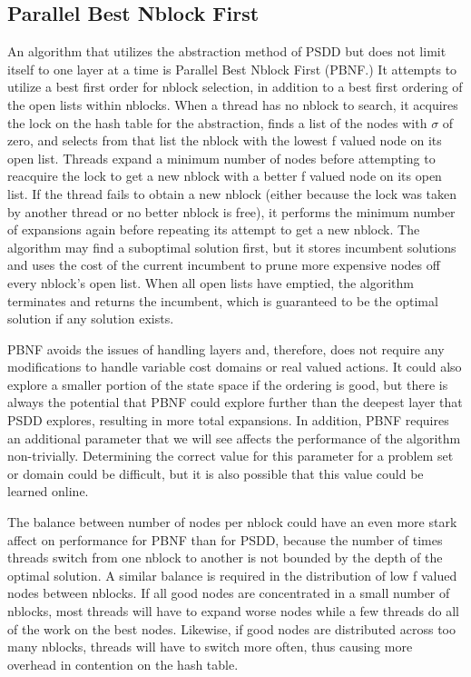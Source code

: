 \documentclass{article}
\begin{document}
\subsection{Parallel Best Nblock First}
An algorithm that utilizes the abstraction method of PSDD but does not limit itself to one layer at a time is Parallel Best Nblock First (PBNF.) It attempts to utilize a best first order for nblock selection, in addition to a best first ordering of the open lists within nblocks. When a thread has no nblock to search, it acquires the lock on the hash table for the abstraction, finds a list of the nodes with $\sigma$ of zero, and selects from that list the nblock with the lowest f valued node on its open list. Threads expand a minimum number of nodes before attempting to reacquire the lock to get a new nblock with a better f valued node on its open list. If the thread fails to obtain a new nblock (either because the lock was taken by another thread or no better nblock is free), it performs the minimum number of expansions again before repeating its attempt to get a new nblock. The algorithm may find a suboptimal solution first, but it stores incumbent solutions and uses the cost of the current incumbent to prune more expensive nodes off every nblock's open list. When all open lists have emptied, the algorithm terminates and returns the incumbent, which is guaranteed to be the optimal solution if any solution exists.

PBNF avoids the issues of handling layers and, therefore, does not require any modifications to handle variable cost domains or real valued actions. It could also explore a smaller portion of the state space if the ordering is good, but there is always the potential that PBNF could explore further than the deepest layer that PSDD explores, resulting in more total expansions. In addition, PBNF requires an additional parameter that we will see affects the performance of the algorithm non-trivially. Determining the correct value for this parameter for a problem set or domain could be difficult, but it is also possible that this value could be learned online.

The balance between number of nodes per nblock could have an even more stark affect on performance for PBNF than for PSDD, because the number of times threads switch from one nblock to another is not bounded by the depth of the optimal solution. A similar balance is required in the distribution of low f valued nodes between nblocks. If all good nodes are concentrated in a small number of nblocks, most threads will have to expand worse nodes while a few threads do all of the work on the best nodes. Likewise, if good nodes are distributed across too many nblocks, threads will have to switch more often, thus causing more overhead in contention on the hash table.
\end{document}
